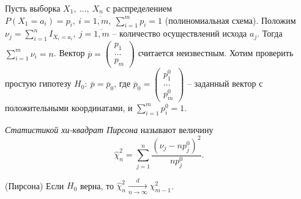 Пусть выборка $\displaystyle X_{1} ,\ \dotsc ,\ X_{n}$ с распределением $\displaystyle P( X_{1} =a_{i}) =p_{i} ,\ i=\overline{1,m} ,\ \sum _{i=1}^{m} p_{i} =1$ (полиномиальная схема). Положим $\displaystyle \nu _{j} =\sum _{i=1}^{n} I_{X_{i} =a_{i}} ,\ j=\overline{1,m}$ -- количество осуществлений исхода $\displaystyle a_{j}$. Тогда $\displaystyle \sum _{i=1}^{m} \nu _{i} =n$. Вектор $\displaystyle \overline{p} =\begin{pmatrix}
p_{1}\\
\dotsc \\
p_{m}
\end{pmatrix}$ считается неизвестным. Хотим проверить простую гипотезу $\displaystyle H_{0} :\ \overline{p} =\overline{p}_{0}$, где $\displaystyle \overline{p}_{0} =\begin{pmatrix}
p_{1}^{0}\\
\dotsc \\
p_{m}^{0}
\end{pmatrix}$ -- заданный вектор с положительными координатами, и $\displaystyle \sum _{i=1}^{m} p_{i}^{0} =1$.
\begin{definition}
    \textit{Статистикой хи-квадрат Пирсона} называют величину
    \begin{equation*}
        \hat{\chi }_{n}^{2} =\sum _{j=1}^{n}\dfrac{\left( \nu _{j} -np_{j}^{0}\right)^{2}}{np_{j}^{0}} .
    \end{equation*}
\end{definition}
\begin{theorem}
    (Пирсона) Если $\displaystyle H_{0}$ верна, то $\displaystyle \hat{\chi }_{n}^{2}\xrightarrow[n\rightarrow \infty ]{d} \chi _{m-1}^{2}$.
\end{theorem}
